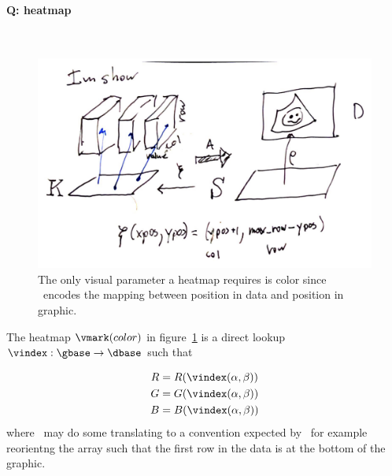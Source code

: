\documentclass[../main.tex]{subfiles}
\begin{document}
\paragraph{Q: heatmap}\mbox{} \\
\label{sec:artist_example_heatmap}
\begin{figure}[H]
    \includegraphics[width=\textwidth]{figures/math/heatmap.png}
    \caption{The only visual parameter a heatmap requires is color since \vindex\ encodes the mapping between position in data and position in graphic. }
    \label{fig:artist_heatmap}
\end{figure}

The heatmap $\vmark(color)$ in figure~\ref{fig:artist_heatmap} is a direct lookup $\vindex:\gbase\rightarrow\dbase$ such that 

\begin{align}
R &= R(\vindex(\alpha, \beta))\\
G &= G(\vindex(\alpha, \beta))\\
B &= B(\vindex(\alpha, \beta))
\end{align}
where \vindex\ may do some translating to a convention expected by \vmark\, for example reorientng the array such that the first row in the data is at the bottom of the graphic. 
\end{document}
